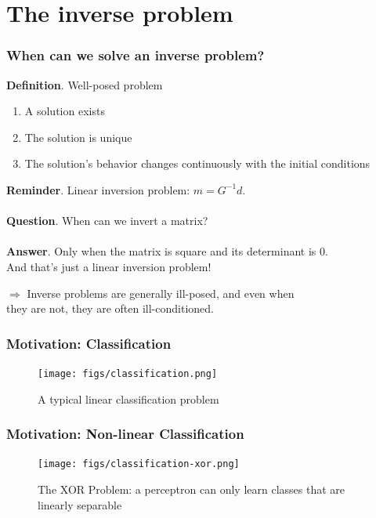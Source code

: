 \documentclass[10pt, compress]{beamer}
\begin{document}
\section{The inverse problem}

\begin{frame}[fragile] \frametitle{When can we solve an inverse problem?}
    \textbf{Definition}. {\color{blue} Well-posed problem} 
    \begin{enumerate}
        \item A solution exists
        \item The solution is unique
        \item The solution's behavior changes continuously with the initial conditions
    \end{enumerate} 
    \textbf{Reminder}. Linear inversion problem: $m=G^{-1}d$. \\ \\
    \pause \textbf{Question}. When can we invert a matrix? \\ \\
    \pause \textbf{Answer}. Only when the matrix is square and its determinant is 0. \\ And that's just a linear inversion problem! \\ 
    \begin{center} $\Rightarrow$
        Inverse problems are generally \alert{ill-posed}, and even when \\ they are not, they are often \alert{ill-conditioned}. 
    \end{center}
\end{frame}


\begin{frame}[fragile] \frametitle{Motivation: Classification}
    \begin{figure}
        \centering
        \texttt{[image: figs/classification.png]}
        \caption{A typical linear classification problem}
    \end{figure}
\end{frame}

\begin{frame}[fragile] \frametitle{Motivation: Non-linear Classification}
    \begin{figure}
        \centering
        \texttt{[image: figs/classification-xor.png]}
        \caption{The XOR Problem: a perceptron can only learn classes that are linearly separable}
    \end{figure}
\end{frame}
\end{document}
